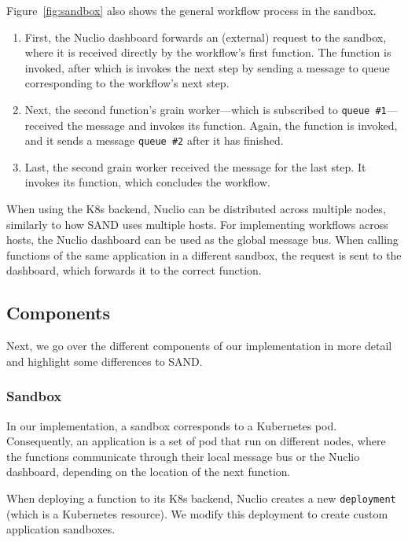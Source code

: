 Figure~\ref{fig:sandbox} also shows the general workflow process in the sandbox. 
\begin{enumerate}
    \item First, the Nuclio dashboard forwards an (external) request to the sandbox, where it is received directly by the workflow's first function. 
        The function is invoked, after which is invokes the next step by sending a message to queue corresponding to the workflow's next step.
    \item Next, the second function's grain worker—which is subscribed to \texttt{queue \#1}—received the message and invokes its function.
        Again, the function is invoked, and it sends a message \texttt{queue \#2} after it has finished.
    \item Last, the second grain worker received the message for the last step.
        It invokes its function, which concludes the workflow.
\end{enumerate}

When using the K8s backend, Nuclio can be distributed across multiple nodes, similarly to how SAND uses multiple hosts.
For implementing workflows across hosts, the Nuclio dashboard can be used as the global message bus. 
When calling functions of the same application in a different sandbox, the request is sent to the dashboard, which forwards it to the correct function.

\subsection{Components}

Next, we go over the different components of our implementation in more detail and highlight some differences to SAND.

\subsubsection{Sandbox}\label{subsub:sandbox}

In our implementation, a sandbox corresponds to a Kubernetes pod. 
Consequently, an application is a set of pod that run on different nodes, where the functions communicate through their local message bus or the Nuclio dashboard, depending on the location of the next function.

When deploying a function to its K8s backend, Nuclio creates a new \texttt{deployment} (which is a Kubernetes resource).
We modify this deployment to create custom application sandboxes.

